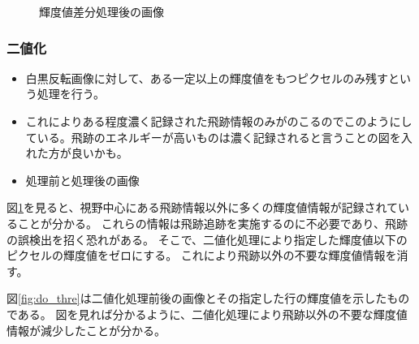 \documentclass[12pt,a4paper]{jarticle}
\begin{document}
\begin{figure}[htbp]
\begin{center}
\begin{tabular}{c}
      \end{tabular}
      \caption{輝度値差分処理後の画像\label{fig:do_sub}}
    \end{center}
\end{figure}
\subsubsection{二値化}
\begin{itemize}
    \item 白黒反転画像に対して、ある一定以上の輝度値をもつピクセルのみ残すという処理を行う。
    \item これによりある程度濃く記録された飛跡情報のみがのこるのでこのようにしている。飛跡のエネルギーが高いものは濃く記録されると言うことの図を入れた方が良いかも。
    \item 処理前と処理後の画像
\end{itemize}
図\ref{fig:do_sub}を見ると、視野中心にある飛跡情報以外に多くの輝度値情報が記録されていることが分かる。
これらの情報は飛跡追跡を実施するのに不必要であり、飛跡の誤検出を招く恐れがある。
そこで、二値化処理により指定した輝度値以下のピクセルの輝度値をゼロにする。
これにより飛跡以外の不要な輝度値情報を消す。
\par
図\ref{fig:do_thre}は二値化処理前後の画像とその指定した行の輝度値を示したものである。
図を見れば分かるように、二値化処理により飛跡以外の不要な輝度値情報が減少したことが分かる。
\end{document}
